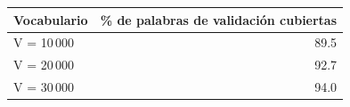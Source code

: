\begin{tabular}{lr}
\toprule
Vocabulario & \% de palabras de validación cubiertas \\
\midrule
V = 10\,000 & 89.5 \\
V = 20\,000 & 92.7 \\
V = 30\,000 & 94.0 \\
\bottomrule
\end{tabular}
